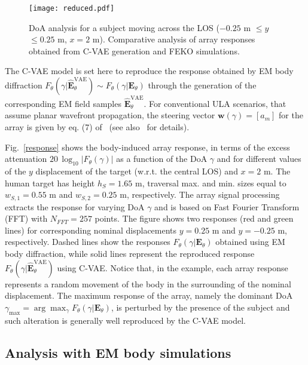 \begin{figure}
\centering \texttt{[image: reduced.pdf]} \protect\caption{\label{response-1} DoA analysis for a subject moving across the LOS ($-0.25$ m $\leq y$ $\leq0.25$ m, $x=2$ m). Comparative analysis of array responses obtained from C-VAE generation and FEKO\textsuperscript{\textregistered} simulations.}
\end{figure}

The C-VAE model is set here to reproduce the response obtained by EM body diffraction $F_{\theta}(\gamma|\widehat{\mathbf{E}}_{\theta}^{\mathrm{VAE}})\sim F_{\theta}(\gamma|\mathbf{E}_{\theta})$ through the generation of the corresponding EM field samples $\widehat{\mathbf{E}}_{\theta}^{\mathrm{VAE}}$. For conventional ULA scenarios, that assume planar wavefront propagation, the steering vector $\mathbf{w}(\gamma)=\left[a_{m}\right]$ for the array is given by eq. (7) of~\cite{mimo} (see also~\cite{benesty-2021} for details).


Fig.~\ref{response} shows the body-induced array response, in terms of the excess attenuation $20\,\log_{10}|F_{\theta}(\gamma)|$ as a function of the DoA $\gamma$ and for different values of the $y$ displacement of the target (w.r.t. the central LOS) and $x=2$ m. The human target has height $h_{S}=1.65$ m, traversal max. and min. sizes equal to $w_{S,1}=0.55$ m and $w_{S,2}=0.25$ m, respectively. The array signal processing extracts the response for varying DoA $\gamma$ and is based on Fast Fourier Transform (FFT) with $N_{FFT}=257$ points. The figure shows two responses (red and green lines) for corresponding nominal displacements $y=0.25$ m and $y=-0.25$ m, respectively. Dashed lines show the responses $F_{\theta}(\gamma|\mathbf{E}_{\theta})$ obtained using EM body diffraction, while solid lines represent the reproduced response $F_{\theta}(\gamma|\widehat{\mathbf{E}}_{\theta}^{\mathrm{VAE}})$ using C-VAE. Notice that, in the example, each array response represents a random movement of the body in the surrounding of the nominal displacement. The maximum response of the array, namely the dominant DoA $\gamma_{\mathrm{max}}=\arg\max_{\gamma}F_{\theta}(\gamma|\mathbf{E}_{\theta})$, is perturbed by the presence of the subject and such alteration is generally well reproduced by the C-VAE model. 

\subsection{Analysis with EM body simulations}
\label{subsec:Analysis}

